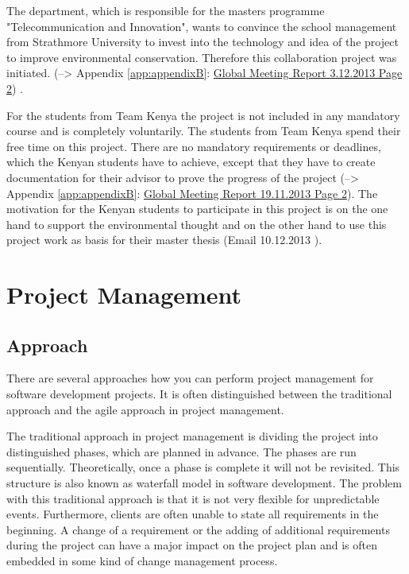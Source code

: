 The department, which is responsible for the masters programme "Telecommunication and Innovation", wants to convince the school management from Strathmore University to invest into the technology and idea of the project to improve environmental conservation. Therefore this collaboration project was initiated. (--> Appendix \ref{app:appendixB}: \hyperlink{GSD20131203.2}{Global Meeting Report 3.12.2013 Page 2}) .

For the students from Team Kenya the project is not included in any mandatory course and is completely voluntarily. The students from Team Kenya spend their free time on this project. There are no mandatory requirements or deadlines, which the Kenyan students have to achieve, except that they have to create documentation for their advisor to prove the progress of the project (--> Appendix \ref{app:appendixB}: \hyperlink{GSD20131119.2}{Global Meeting Report 19.11.2013 Page 2}). The motivation for the Kenyan students to participate in this project is on the one hand to support the environmental thought and on the other hand to use this project work as basis for their master thesis (Email 10.12.2013 ).



\section{Project Management}


\subsection{Approach}

There are several approaches how you can perform project management for software development projects. It is often distinguished between the traditional approach and the agile approach in project management.

The traditional approach in project management is dividing the project into distinguished phases, which are planned in advance. The phases are run sequentially. Theoretically, once a phase is complete it will not be revisited. This structure is also known as waterfall model in software development.
The problem with this traditional approach is that it is not very flexible for unpredictable events. Furthermore, clients are often unable to state all requirements in the beginning. A change of a requirement or the adding of additional requirements during the project can have a major impact on the project plan and is often embedded in some kind of change management process.

